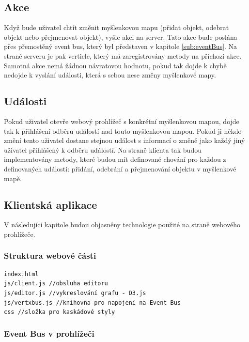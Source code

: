 \subsection{Akce}

Když bude uživatel chtít změnit myšlenkovou mapu (přidat objekt, odebrat objekt nebo přejmenovat objekt), vyšle akci na server. Tato akce bude poslána přes přemostěný event bus, který byl představen v kapitole \ref{sub:eventBus}. Na straně serveru je pak verticle, který má zaregistrovány metody na příchozí akce. Samotná akce nemá žádnou návratovou hodnotu, pokud tak dojde k chybě nedojde k vyslání události, která s sebou nese změny myšlenkové mapy.

\subsection{Události}

Pokud uživatel otevře webový prohlížeč s konkrétní myšlenkovou mapou, dojde tak k přihlášení odběru událostí nad touto myšlenkovou mapou. Pokud ji někdo změní tento uživatel dostane stejnou událost s informací o změně jako každý jiný uživatel přihlášený k odběru událostí.
Na straně klienta tak budou implementovány metody, které budou mít definované chování pro každou z definovaných událostí: přidání, odebrání a přejmenování objektu v myšlenkové mapě.

\subsection{Klientská aplikace}

V následující kapitole budou objasněny technologie použité na straně webového prohlížeče.

\subsubsection{Struktura webové části}

\begin{lstlisting}
index.html
js/client.js //obsluha editoru
js/editor.js //vykreslování grafu - D3.js
js/vertxbus.js //knihovna pro napojení na Event Bus
css //složka pro kaskádové styly
\end{lstlisting}


\subsubsection{Event Bus v prohlížeči}

